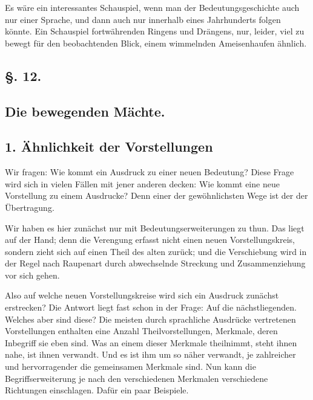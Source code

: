 {Es wäre ein interessantes Schauspiel, wenn man der Bedeutungsgeschichte auch nur einer Sprache, und dann auch nur innerhalb eines Jahrhunderts folgen könnte. Ein Schauspiel fortwährenden Ringens und Drängens, nur, leider, viel zu bewegt für den beobachtenden Blick, einem wimmelnden Ameisenhaufen ähnlich.

\label{sp.232}

\subsection*{§. 12.}\label{III.II.II.12}
\subsection*{Die bewegenden Mächte.}
\subsection*{1. Ähnlichkeit der Vorstellungen}\label{III.II.II.12.1}
\largerpage[1]Wir fragen: Wie kommt ein Ausdruck zu einer neuen Bedeutung? Diese Frage wird sich in vielen Fällen mit jener anderen decken: Wie \label{fp.230} kommt eine neue Vorstellung zu einem Ausdrucke? Denn einer der gewöhnlichsten Wege ist der der Übertragung.

Wir haben es hier zunächst nur mit Bedeutungserweiterungen zu thun. Das liegt auf der Hand; denn die Verengung erfasst nicht einen neuen Vorstellungskreis, sondern zieht sich auf einen Theil des alten zurück; und die Verschiebung wird in der Regel nach Raupenart durch abwechselnde Streckung und Zusammenziehung vor sich gehen.

Also auf welche neuen Vorstellungskreise wird sich ein Ausdruck zunächst erstrecken? Die Antwort liegt fast schon in der Frage: Auf die nächstliegenden. Welches aber sind diese? Die meisten durch sprachliche Ausdrücke vertretenen Vorstellungen enthalten eine Anzahl Theilvorstellungen, Merkmale, deren Inbegriff sie eben sind. Was an einem dieser Merkmale theilnimmt, steht ihnen nahe, ist ihnen verwandt. Und es ist ihm um so näher verwandt, je zahlreicher und hervorragender die gemeinsamen Merkmale sind. Nun kann die Begriffserweiterung je nach den verschiedenen Merkmalen verschiedene Richtungen einschlagen. Dafür ein paar Beispiele.

}
